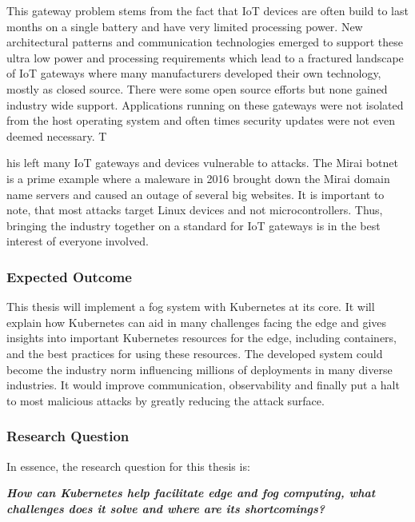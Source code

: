 {This gateway problem stems from the fact that IoT devices are often build to last months on a single battery and have very limited processing power. New architectural patterns and communication technologies emerged to support these ultra low power and processing requirements which lead to a fractured landscape of IoT gateways where many manufacturers developed their own technology, mostly as closed source. There were some open source efforts but none gained industry wide support. Applications running on these gateways were not isolated from the host operating system and often times security updates were not even deemed necessary. T

his left many IoT gateways and devices vulnerable to attacks. The Mirai botnet\cite{7971869MiraiAndOtherBotnetLinux} is a prime example where a maleware in 2016 brought down the Mirai domain name servers and caused an outage of several big websites. It is important to note, that most attacks target Linux devices and not microcontrollers. Thus, bringing the industry together on a standard for IoT gateways is in the best interest of everyone involved. 
}

\subsubsection{Expected Outcome}
This thesis will implement a fog system with Kubernetes at its core. It will explain how Kubernetes can aid in many challenges facing the edge and gives insights into important Kubernetes resources for the edge, including containers, and the best practices for using these resources. The developed system could become the industry norm influencing millions of deployments in many diverse industries. It would improve communication, observability and finally put a halt to most malicious attacks by greatly reducing the attack surface.

\subsubsection{Research Question}
In essence, the research question for this thesis is:
\begin{displayquote}\begin{center}
{\textit{\textbf{How can Kubernetes help facilitate edge and fog computing, what challenges does it solve and where are its shortcomings?}}}
\end{center}\end{displayquote}

